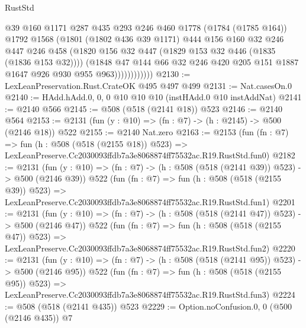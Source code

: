 \begin{lexlean}{RustStd}
\begin{coremodule}
                        @39
                        @160
                        @1171
                        @287
                        @435
                        @293
                        @246
                        @460
                        @1778
                        (@1784 (@1785 @164))
                        @1792
                        @1568
                        (@1801
                          (@1802 @436 @39 @1171)
                          @444
                          @156
                          @160
                          @32
                          @246
                          @447
                          @246
                          @458
                          (@1820 @156 @32 @447 (@1829 @153 @32 @446 (@1835 (@1836 @153 @32))))
                          (@1848
                            @47
                            @144
                            @66
                            @32
                            @246
                            @420
                            @205
                            @151
                            @1887
                            @1647
                            @926
                            @930
                            @955
                            @963))))))))))))
@2130 := LexLeanPreservation.Rust.CrateOK @495 @497 @499
@2131 := Nat.casesOn.{0}
@2140 := HAdd.hAdd.{0, 0, 0} @10 @10 @10 (instHAdd.{0} @10 instAddNat)
@2141 := @2140 @566
@2145 := @508 (@518 (@2141 @18)) @523
@2146 := @2140 @564
@2153 := @2131 (fun (y : @10) => (fn : @7) -> (h : @2145) -> @500 (@2146 @18)) @522
@2155 := @2140 Nat.zero
@2163 := @2153
    (fun (fn : @7) =>
    fun (h : @508 (@518 (@2155 @18)) @523) =>
    LexLeanPreserve.Cc2030093ffdb7a3e8068874ff75532ac.R19.RustStd.fun0)
@2182 := @2131
    (fun (y : @10) => (fn : @7) -> (h : @508 (@518 (@2141 @39)) @523) -> @500 (@2146 @39))
    @522
    (fun (fn : @7) =>
    fun (h : @508 (@518 (@2155 @39)) @523) =>
    LexLeanPreserve.Cc2030093ffdb7a3e8068874ff75532ac.R19.RustStd.fun1)
@2201 := @2131
    (fun (y : @10) => (fn : @7) -> (h : @508 (@518 (@2141 @47)) @523) -> @500 (@2146 @47))
    @522
    (fun (fn : @7) =>
    fun (h : @508 (@518 (@2155 @47)) @523) =>
    LexLeanPreserve.Cc2030093ffdb7a3e8068874ff75532ac.R19.RustStd.fun2)
@2220 := @2131
    (fun (y : @10) => (fn : @7) -> (h : @508 (@518 (@2141 @95)) @523) -> @500 (@2146 @95))
    @522
    (fun (fn : @7) =>
    fun (h : @508 (@518 (@2155 @95)) @523) =>
    LexLeanPreserve.Cc2030093ffdb7a3e8068874ff75532ac.R19.RustStd.fun3)
@2224 := @508 (@518 (@2141 @435)) @523
@2229 := Option.noConfusion.{0, 0} (@500 (@2146 @435)) @7

\end{coremodule}
\end{lexlean}
